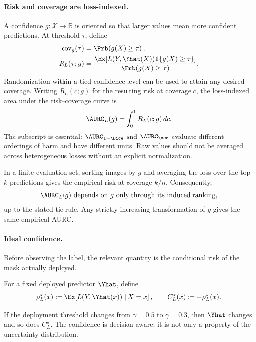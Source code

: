 \paragraph{Risk and coverage are loss-indexed.}
A confidence $g:\mathcal X\to\mathbb R$ is oriented so that larger values mean more
confident predictions. At threshold $\tau$, define
\begin{equation}\label{eq:risk-coverage}
\begin{split}
  \mathrm{cov}_g(\tau)
  &=\Prb\!\left(g(X)\geq\tau\right),\\
  R_L(\tau;g)
  &=\frac{\Ex\!\left[
      L(Y,\Yhat(X))\mathbf 1\{g(X)\geq\tau\}
    \right]}
    {\Prb(g(X)\geq\tau)} .
\end{split}
\end{equation}
Randomization within a tied confidence level can be used to attain any desired
coverage. Writing $R_L(c;g)$ for the resulting risk at coverage $c$, the
loss-indexed area under the risk--coverage curve is
\begin{equation}\label{eq:aurc-l}
  \AURC_L(g)=\int_0^1 R_L(c;g)\,dc .
\end{equation}
The subscript is essential: $\AURC_{1-\Dice}$ and $\AURC_{\HDF}$ evaluate different
orderings of harm and have different units. Raw values should not be averaged across
heterogeneous losses without an explicit normalization.

In a finite evaluation set, sorting images by $g$ and averaging the loss over the top
$k$ predictions gives the empirical risk at coverage $k/n$. Consequently,
\begin{equation}\label{eq:rank}
  \AURC_L(g)\text{ depends on }g\text{ only through its induced ranking,}
\end{equation}
up to the stated tie rule. Any strictly increasing transformation of $g$ gives the
same empirical AURC.

\paragraph{Ideal confidence.}
Before observing the label, the relevant quantity is the conditional risk of the
mask actually deployed.
\begin{definition}\label{def:ideal}
For a fixed deployed predictor $\Yhat$, define
\begin{equation}\label{eq:ideal}
  \rho_L^\star(x)
  :=\Ex\!\left[L(Y,\Yhat(x))\mid X=x\right],
  \qquad
  C_L^\star(x):=-\rho_L^\star(x).
\end{equation}
\end{definition}
If the deployment threshold changes from $\gamma=0.5$ to $\gamma=0.3$, then
$\Yhat$ changes and so does $C_L^\star$. The confidence is decision-aware; it is not
only a property of the uncertainty distribution.

